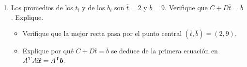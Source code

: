\documentclass[12pt,a4paper]{article}
\newcommand{\bi}[1]{\hbox{\boldmath$#1$}}
\newcommand\1{\mbox{\,\vrule height-0.8pt depth1.0pt width2pc\,}}
\newcommand\2{\mbox{\,\vrule height-0.8pt depth1.0pt width1pc\,}}
\DeclareRobustCommand\transp{^{\mathrm{T}}}
\begin{document}
\begin{enumerate}
\item Los promedios de los $t_i$ y de los $b_i$ son $\overline{t}=2$ y $\overline{b}=9$. Verifique que $C+D\overline{t}=\overline{b}$. Explique.
\begin{itemize}
\item[(a)] Verifique que la mejor recta pasa por el punto central $(\overline{t},\overline{b})=(2,9)$.
\item[(b)] Explique por qué $C+D\overline{t} =\overline{b}$ se deduce de la primera ecuación en $A\transp A \widehat{\bi x} = A\transp  \bi b$.
\end{itemize}


\end{enumerate}
\end{document}
